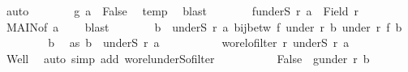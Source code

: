 \begin{isabellebody}
\ auto\isanewline
\ \ \isanewline
\ \ \isamarkupfalse%
\ {}{\isacharcolon}{\kern0pt}\ {\isachardoublequoteopen}g\ {\isacharquery}{\kern0pt}a\ {\isacharequal}{\kern0pt}\ False{\isachardoublequoteclose}\ \isamarkupfalse%
\ temp\ \isamarkupfalse%
\ blast\isanewline
\ \ \isanewline
\ \ \isamarkupfalse%
\ {}{\isacharcolon}{\kern0pt}\ {\isachardoublequoteopen}f{\isacharbackquote}{\kern0pt}{\isacharparenleft}{\kern0pt}underS\ r\ {\isacharquery}{\kern0pt}a{\isacharparenright}{\kern0pt}\ {\isacharequal}{\kern0pt}\ Field\ r{\isacharprime}{\kern0pt}{\isachardoublequoteclose}\isanewline
\ \ \isamarkupfalse%
\ MAIN{}{\isacharbrackleft}{\kern0pt}of\ {\isacharquery}{\kern0pt}a{\isacharbrackright}{\kern0pt}\ {}\ {}\ \isamarkupfalse%
\ blast\isanewline
\ \ \isanewline
\ \ \isamarkupfalse%
\ {}{\isacharcolon}{\kern0pt}\ {\isachardoublequoteopen}{\isasymforall}b\ {\isasymin}\ underS\ r\ {\isacharquery}{\kern0pt}a{\isachardot}{\kern0pt}\ bij{\isacharunderscore}{\kern0pt}betw\ f\ {\isacharparenleft}{\kern0pt}under\ r\ b{\isacharparenright}{\kern0pt}\ {\isacharparenleft}{\kern0pt}under\ r{\isacharprime}{\kern0pt}\ {\isacharparenleft}{\kern0pt}f\ b{\isacharparenright}{\kern0pt}{\isacharparenright}{\kern0pt}{\isachardoublequoteclose}\isanewline
\ \ \isamarkupfalse%
\isanewline
\ \ \ \ \isamarkupfalse%
\ b\ \isamarkupfalse%
\ as{\isacharcolon}{\kern0pt}\ {\isachardoublequoteopen}b\ {\isasymin}\ underS\ r\ {\isacharquery}{\kern0pt}a{\isachardoublequoteclose}\isanewline
\ \ \ \ \isamarkupfalse%
\isanewline
\ \ \ \ \isamarkupfalse%
\ {\isachardoublequoteopen}wo{\isacharunderscore}{\kern0pt}rel{\isachardot}{\kern0pt}ofilter\ r\ {\isacharparenleft}{\kern0pt}underS\ r\ {\isacharquery}{\kern0pt}a{\isacharparenright}{\kern0pt}{\isachardoublequoteclose}\isanewline
\ \ \ \ \isamarkupfalse%
\ Well\ \isamarkupfalse%
\ {\isacharparenleft}{\kern0pt}auto\ simp\ add{\isacharcolon}{\kern0pt}\ wo{\isacharunderscore}{\kern0pt}rel{\isachardot}{\kern0pt}underS{\isacharunderscore}{\kern0pt}ofilter{\isacharparenright}{\kern0pt}\isanewline
\ \ \ \ \isamarkupfalse%
\isanewline
\ \ \ \ \isamarkupfalse%
\ {\isachardoublequoteopen}False\ {\isasymnotin}\ g{\isacharbackquote}{\kern0pt}{\isacharparenleft}{\kern0pt}under\ r\ b{\isacharparenright}{\kern0pt}{\isachardoublequoteclose}\ \isamarkupfalse%

\end{isabellebody}
